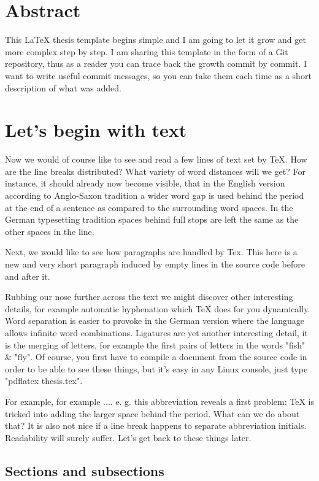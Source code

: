 \documentclass[11pt,a4paper,twoside,titlepage]{book}
\begin{document}
\frontmatter
\chapter{Abstract}%
This LaTeX thesis template begins simple and I am going to let it grow and get more complex step by step. I am sharing this template in the form of a Git repository, thus as a reader you can trace back the growth commit by commit. I want to write useful commit messages, so you can take them each time as a short description of what was added.

\mainmatter
\chapter{Let's begin with text}%
Now we would of course like to see and read a few lines of text set by TeX. How are the line breaks distributed? What variety of word distances will we get? For instance, it should already now become visible, that in the English version according to Anglo-Saxon tradition a wider word gap is used behind the period at the end of a sentence as compared to the surrounding word spaces. In the German typesetting tradition spaces behind full stops are left the same as the other spaces in the line.

Next, we would like to see how paragraphs are handled by Tex. This here is a new and very short paragraph induced by empty lines in the source code before and after it.

Rubbing our nose further across the text we might discover other interesting details, for example automatic hyphenation which TeX does for you dynamically. Word separation is easier to provoke in the German version where the language allows infinite word combinations. Ligatures are yet another interesting detail, it is the merging of letters, for example the first pairs of letters in the words "fish" \& "fly". Of course, you first have to compile a document from the source code in order to be able to see these things, but it's easy in any Linux console, just type "pdflatex thesis.tex".

For example, for example .... e. g. this abbreviation reveals a first problem: TeX is tricked into adding the larger space behind the period. What can we do about that? It is also not nice if a line break happens to separate abbreviation initials. Readability will surely suffer. Let's get back to these things later.

\section{Sections and subsections}
\end{document}
